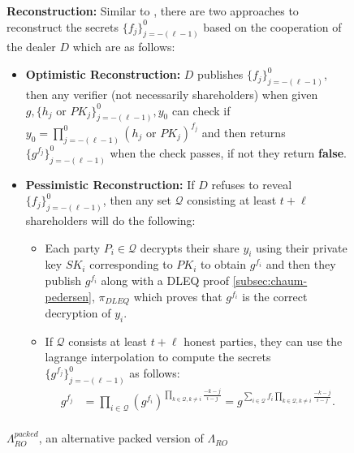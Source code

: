 \begin{figure}[ht]
{\begin{tcolorbox}[title=\textbf{$\Lambda_{RO}^{packed}$}, width=1.2\textwidth, colframe=blue!75!black, colback=blue!10, sharp corners]
        \vspace{0.5em}
        \textbf{Reconstruction:}
            Similar to \cite{cryptoeprint:2025/576}, there are two approaches to reconstruct the secrets 
            $\{f_j\}_{j=-(\ell-1)}^0$ based on the cooperation of the dealer $D$ which are as follows:
            \begin{itemize}
                \item \textbf{Optimistic Reconstruction:} $D$ publishes $\{f_j\}_{j=-(\ell-1)}^0$, then any verifier (not necessarily shareholders) 
                when given $g,\{h_j\text{ or }PK_j\}_{j=-(\ell-1)}^0,y_0$ can check if $y_0=\prod_{j=-(\ell-1)}^0(h_j\text{ or }PK_j)^{f_j}$ 
                and then returns $\{g^{f_j}\}_{j=-(\ell-1)}^0$ when the check passes, if not they return \textbf{false}.
                \item \textbf{Pessimistic Reconstruction:} If $D$ refuses to reveal $\{f_j\}_{j=-(\ell-1)}^0$, then any set 
                $\mathcal{Q}$ consisting at least $t+\ell$ shareholders will do the following:
                \begin{itemize}
                    \item Each party $P_i\in\mathcal{Q}$ decrypts their share $y_i$ using their private key $SK_i$ 
                      corresponding to $PK_i$ to obtain $g^{f_i}$ and then they publish $g^{f_i}$ 
                      along with a DLEQ proof \ref{subsec:chaum-pedersen}, $\pi_{DLEQ}$ which proves that 
                      $g^{f_i}$ is the correct decryption of $y_i$.
                    \item If $\mathcal{Q}$ consists at least $t+\ell$ honest parties, they can use the 
                    lagrange interpolation to compute the secrets $\{g^{f_j}\}_{j=-(\ell-1)}^0$ as follows:
                    \begin{align*}
                        g^{f_j} &= \prod_{i\in\mathcal{Q}}(g^{f_i})^{\prod_{k\in\mathcal{Q},k\neq i}\frac{-k-j}{i-j}}= g^{\sum_{i\in\mathcal{Q}}f_i\prod_{k\in\mathcal{Q},k\neq i}\frac{-k-j}{i-j}}.\\
                    \end{align*}
                \end{itemize}
            \end{itemize}
    \end{tcolorbox}
    }
    \caption[PPPVSS]{$\Lambda_{RO}^{packed}$, an alternative packed version of $\Lambda_{RO}$ \cite{cryptoeprint:2025/576}}
    \label{fig:packed-shamir-PPPVSS-ro}
\end{figure}
